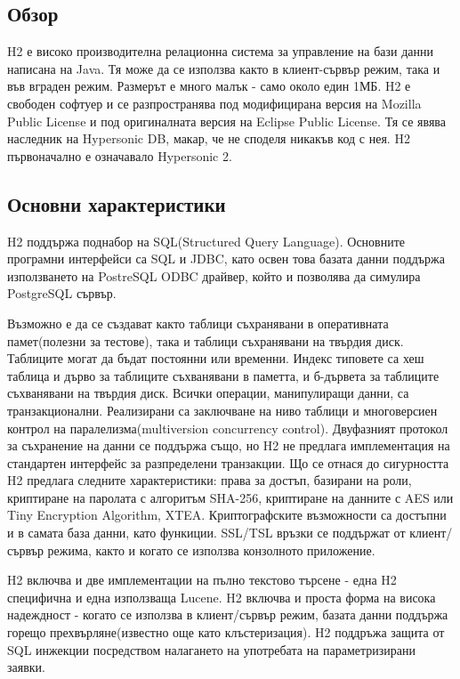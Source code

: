 \subsection{Обзор}
H2 е високо производителна релационна система за управление на бази
данни написана на Java. Тя може да се използва както в клиент-сървър
режим, така и във вграден режим. Размерът е много малък - само около
един 1МБ. H2 е свободен софтуер и се разпространява под модифицирана
версия на Mozilla Public License и под оригиналната версия на Eclipse
Public License. Тя се явява наследник на Hypersonic DB, макар, че не
споделя никакъв код с нея. H2 първоначално е означавало Hypersonic 2.

\subsection{Основни характеристики}
H2 поддържа поднабор на SQL(Structured Query Language). Основните
програмни интерфейси са SQL и JDBC, като освен това базата данни
поддържа използването на PostreSQL ODBC драйвер, който и позволява да
симулира PostgreSQL сървър.

Възможно е да се създават както таблици съхранявани в оперативната
памет(полезни за тестове), така и таблици съхранявани на твърдия
диск. Таблиците могат да бъдат постоянни или временни. Индекс типовете
са хеш таблица и дърво за таблиците съхванявани в паметта, и б-дървета
за таблиците съхванявани на твърдия диск. Всички операции,
манипулиращи данни, са транзакционални. Реализирани са заключване на
ниво таблици и многоверсиен контрол на паралелизма(multiversion
concurrency control). Двуфазният протокол за съхранение на данни се
поддържа също, но H2 не предлага имплементация на стандартен интерфейс
за разпределени транзакции. Що се отнася до сигурността H2 предлага
следните характеристики: права за достъп, базирани на роли, криптиране
на паролата с алгоритъм SHA-256, криптиране на данните с AES или Tiny
Encryption Algorithm, XTEA. Криптографските възможности са достъпни и
в самата база данни, като функиции. SSL/TSL връзки се поддържат от
клиент/сървър режима, както и когато се използва конзолното
приложение.

H2 включва и две имплементации на пълно текстово търсене - една H2
специфична и една използваща Lucene. H2 включва и проста форма на
висока надеждност - когато се използва в клиент/сървър режим, базата
данни поддържа горещо прехвърляне(известно още като клъстеризация). H2
поддръжа защита от SQL инжекции посредством налагането на употребата
на параметризирани заявки.  

